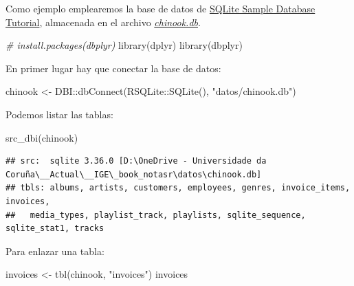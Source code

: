 \documentclass[
]{book}
\newenvironment{Shaded}{\begin{snugshade}}{\end{snugshade}}
\newcommand{\CommentTok}[1]{\textcolor[rgb]{0.56,0.35,0.01}{\textit{#1}}}
\newcommand{\FunctionTok}[1]{\textcolor[rgb]{0.00,0.00,0.00}{#1}}
\newcommand{\NormalTok}[1]{#1}
\newcommand{\OtherTok}[1]{\textcolor[rgb]{0.56,0.35,0.01}{#1}}
\newcommand{\SpecialCharTok}[1]{\textcolor[rgb]{0.00,0.00,0.00}{#1}}
\newcommand{\StringTok}[1]{\textcolor[rgb]{0.31,0.60,0.02}{#1}}
\theoremstyle{break}
\theoremstyle{nonumberplain}
\begin{document}
Como ejemplo emplearemos la base de datos de \href{https://www.sqlitetutorial.net/sqlite-sample-database/}{SQLite Sample Database Tutorial}, almacenada en el archivo \href{datos/chinook.db}{\emph{chinook.db}}.

\begin{Shaded}
\begin{Highlighting}[]
\CommentTok{\# install.packages(\textquotesingle{}dbplyr\textquotesingle{})}
\FunctionTok{library}\NormalTok{(dplyr)}
\FunctionTok{library}\NormalTok{(dbplyr)}
\end{Highlighting}
\end{Shaded}

En primer lugar hay que conectar la base de datos:

\begin{Shaded}
\begin{Highlighting}[]
\NormalTok{chinook }\OtherTok{\textless{}{-}}\NormalTok{ DBI}\SpecialCharTok{::}\FunctionTok{dbConnect}\NormalTok{(RSQLite}\SpecialCharTok{::}\FunctionTok{SQLite}\NormalTok{(), }\StringTok{"datos/chinook.db"}\NormalTok{)}
\end{Highlighting}
\end{Shaded}

Podemos listar las tablas:

\begin{Shaded}
\begin{Highlighting}[]
\FunctionTok{src\_dbi}\NormalTok{(chinook)}
\end{Highlighting}
\end{Shaded}

\begin{verbatim}
## src:  sqlite 3.36.0 [D:\OneDrive - Universidade da Coruña\__Actual\__IGE\_book_notasr\datos\chinook.db]
## tbls: albums, artists, customers, employees, genres, invoice_items, invoices,
##   media_types, playlist_track, playlists, sqlite_sequence, sqlite_stat1, tracks
\end{verbatim}

Para enlazar una tabla:

\begin{Shaded}
\begin{Highlighting}[]
\NormalTok{invoices }\OtherTok{\textless{}{-}} \FunctionTok{tbl}\NormalTok{(chinook, }\StringTok{"invoices"}\NormalTok{)}
\NormalTok{invoices}
\end{Highlighting}
\end{Shaded}
\end{document}
